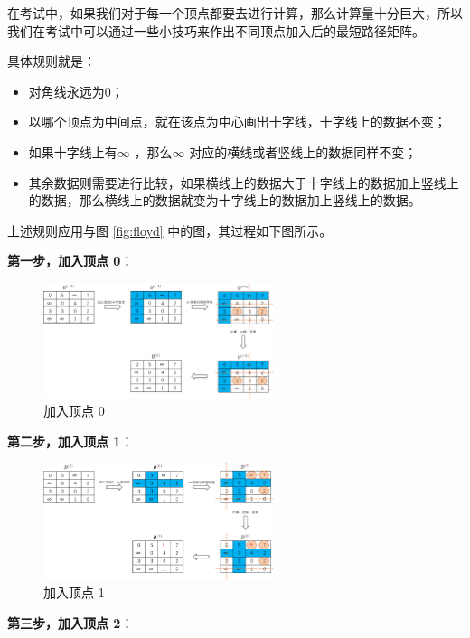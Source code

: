 \documentclass[lang=cn,newtx,10pt,scheme=chinese]{elegantbook}
\begin{document}
在考试中，如果我们对于每一个顶点都要去进行计算，那么计算量十分巨大，所以我们在考试中可以通过一些小技巧来作出不同顶点加入后的最短路径矩阵。

具体规则就是：

\begin{itemize}
  \item 对角线永远为0；
  \item 以哪个顶点为中间点，就在该点为中心画出十字线，十字线上的数据不变；
  \item 如果十字线上有$\infty$ ，那么$\infty$ 对应的横线或者竖线上的数据同样不变；
  \item 其余数据则需要进行比较，如果横线上的数据大于十字线上的数据加上竖线上的数据，那么横线上的数据就变为十字线上的数据加上竖线上的数据。
\end{itemize}


上述规则应用与图 \ref{fig:floyd} 中的图，其过程如下图所示。

\textbf{第一步，加入顶点 0}：

\begin{figure}[h!]
  \centering
  \includegraphics[width=0.6\textwidth]{./figure/pdf/cropped/floyd_addNum0.pdf}
  \caption{加入顶点 0}
  \label{fig:floyd_0}
\end{figure}

\textbf{第二步，加入顶点 1}：

\begin{figure}[h!]
  \centering
  \includegraphics[width=0.6\textwidth]{./figure/pdf/cropped/floyd_addNum1.pdf}
  \caption{加入顶点 1}
  \label{fig:floyd_1}

\end{figure}

\textbf{第三步，加入顶点 2}：
\end{document}
